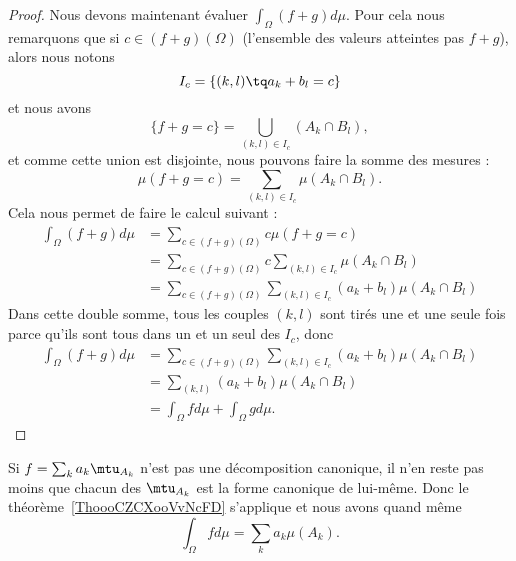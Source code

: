 \begin{proof}
	Nous devons maintenant évaluer \( \int_{\Omega}(f+g)d\mu\). Pour cela nous remarquons que si \( c\in (f+g)(\Omega)\) (l'ensemble des valeurs atteintes pas \( f+g\)), alors nous notons
	\begin{equation}
		I_c=\{ (k,l)\tq a_k+b_l=c \}
	\end{equation}
	et nous avons
	\begin{equation}
		\{ f+g=c \}=\bigcup_{(k,l)\in I_c}(A_k\cap B_l),
	\end{equation}
	et comme cette union est disjointe, nous pouvons faire la somme des mesures :
	\begin{equation}
		\mu(f+g=c)=\sum_{(k,l)\in I_c}\mu(A_k\cap B_l).
	\end{equation}
	Cela nous permet de faire le calcul suivant :
	\begin{subequations}
		\begin{align}
			\int_{\Omega}(f+g)d\mu & =\sum_{c\in (f+g)(\Omega)}c\mu(f+g=c)                                   \\
			                       & =\sum_{c\in(f+g)(\Omega)}c\sum_{(k,l)\in I_c}\mu(A_k\cap B_l)           \\
			                       & =\sum_{c\in(f+g)(\Omega)}\sum_{(k,l)\in I_c} (a_k+b_l) \mu(A_k\cap B_l)
		\end{align}
	\end{subequations}
	Dans cette double somme, tous les couples \( (k,l)\) sont tirés une et une seule fois parce qu'ils sont tous dans un et un seul des \( I_c\), donc
	\begin{subequations}
		\begin{align}
			\int_{\Omega}(f+g)d\mu & = \sum_{c\in(f+g)(\Omega)}\sum_{(k,l)\in I_c} (a_k+b_l) \mu(A_k\cap B_l) \\
			                       & =\sum_{(k,l)}(a_k+b_l)\mu(A_k\cap B_l)                                   \\
			                       & =\int_{\Omega}fd\mu+\int_{\Omega}gd\mu.
		\end{align}
	\end{subequations}
\end{proof}

\begin{remark}
	Si \( f=\sum_ka_k\mtu_{A_k}\) n'est pas une décomposition canonique, il n'en reste pas moins que chacun des \( \mtu_{A_k}\) est la forme canonique de lui-même. Donc le théorème~\ref{ThoooCZCXooVvNcFD} s'applique et nous avons quand même
	\begin{equation}
		\int_{\Omega}fd\mu=\sum_ka_k\mu(A_k).
	\end{equation}
\end{remark}

